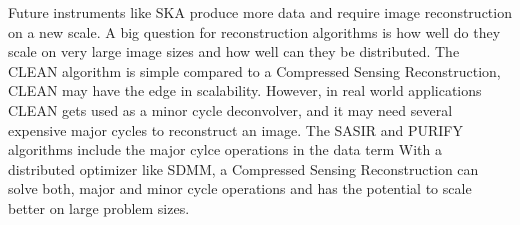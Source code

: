 Future instruments like SKA produce more data and require image reconstruction on a new scale. A big question for reconstruction algorithms is how well do they scale on very large image sizes and how well can they be distributed. The CLEAN algorithm is simple compared to a Compressed Sensing Reconstruction, CLEAN may have the edge in scalability. However, in real world applications CLEAN gets used as a minor cycle deconvolver, and it may need several expensive major cycles to reconstruct an image. The SASIR and PURIFY algorithms include the major cylce operations in the data term With a distributed optimizer like SDMM, a Compressed Sensing Reconstruction can solve both, major and minor cycle operations and has the potential to scale better on large problem sizes.






 

